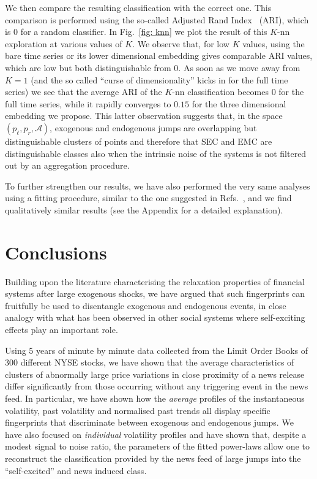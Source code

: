 \documentclass[amsmath,amssymb,aps,pre,floatfix,twocolumn,superscriptaddress]{revtex4}
\begin{document}
We then compare the resulting classification with the correct one. This comparison is performed using the so-called Adjusted Rand Index~\cite{ARI_ref} (ARI), which is 0 for a random classifier. In Fig.~\ref{fig: knn} we plot the result of this $K$-nn exploration at various values of $K$. We observe that, for low $K$ values, using the bare time series or its lower dimensional embedding gives comparable ARI values, which are low but both distinguishable from 0. As soon as we move away from $K=1$ (and the so called ``curse of dimensionality'' kicks in for the full time series) we see that the average ARI of the $K$-nn classification becomes 0 for the full time series, while it rapidly converges to $0.15$ for the three dimensional embedding we propose. This latter observation suggests that, in the space $(p_\ell,p_r,\mathcal{A})$, exogenous and endogenous jumps are overlapping but distinguishable clusters of points and therefore that SEC and EMC are distinguishable classes also when the intrinsic noise of the systems is not filtered out by an aggregation procedure. 

To further strengthen our results, we have also performed the very same analyses using a fitting procedure, similar to the one suggested in Refs.~\cite{sornette_books,sornette_youtube}, and we find qualitatively similar results (see the Appendix for a detailed explanation). 

\section{Conclusions}

Building upon the literature characterising the relaxation properties of financial systems after large exogenous shocks, we have argued that such fingerprints can fruitfully be used to disentangle exogenous and endogenous events, in close analogy with what has been observed in other social systems where self-exciting effects play an important role.

Using 5 years of minute by minute data collected from the Limit Order Books of 300 different NYSE stocks, we have shown that the average characteristics of clusters of abnormally large price variations in close proximity of a news release differ significantly from those occurring without any triggering event in the news feed. In particular, we have shown how the {\it average} profiles of the instantaneous volatility, past volatility and normalised past trends all display specific fingerprints that discriminate between exogenous and endogenous jumps. We have also focused on {\it individual} volatility profiles and have shown that, despite a modest signal to noise ratio, the parameters of the fitted power-laws allow one to reconstruct the classification provided by the news feed of large jumps into the ``self-excited'' and news induced class.
\end{document}

